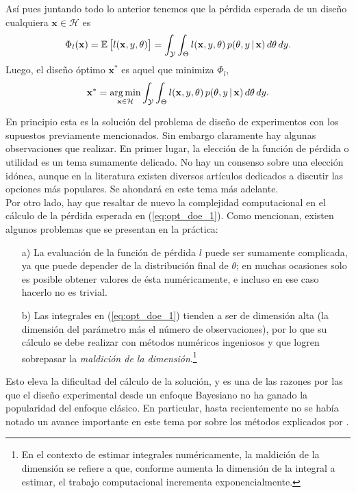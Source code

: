 Así pues juntando todo lo anterior tenemos que la pérdida esperada de un diseño cualquiera $\mathbf{x} \in \mathcal{H}$ es
\begin{equation*}
	\Phi_l(\mathbf{x}) = \mathbb{E} \left[ l(\mathbf{x}, y, \theta) \right] = \int_{\mathcal{Y}} \int_{\Theta} l(\mathbf{x}, y, \theta) \, p(\theta, y \, | \, \mathbf{x}) \,d \theta \,d y.
\end{equation*}
Luego, el diseño óptimo $\mathbf{x}^*$ es aquel que minimiza $\Phi_l$,
\begin{equation} \label{eq:opt_doe_1}
	\mathbf{x}^* = \operatorname*{arg\,min}_{ \mathbf{x} \in \mathcal{H} } \int_{\mathcal{Y}} \int_{\Theta} l(\mathbf{x}, y, \theta) \, p( \theta, y \, | \, \mathbf{x} ) \,d \theta \,d y. 
\end{equation}

En principio esta es la solución del problema de diseño de experimentos con los supuestos previamente mencionados. Sin embargo claramente hay algunas observaciones que realizar. En primer lugar, la elección de la función de pérdida o utilidad es un tema sumamente delicado. No hay un consenso sobre una elección idónea, aunque en la literatura existen diversos artículos dedicados a discutir las opciones más populares. Se ahondará en este tema más adelante. \\

Por otro lado, hay que resaltar de nuevo la complejidad computacional en el cálculo de la pérdida esperada en (\ref{eq:opt_doe_1}). Como \cite{Woods_etal} mencionan, existen algunos problemas que se presentan en la práctica:
\begin{itemize}
\item[a)] La evaluación de la función de pérdida $l$ puede ser sumamente complicada, ya que puede depender de la distribución final de $\theta$; en muchas ocasiones solo es posible obtener valores de ésta numéricamente, e incluso en ese caso hacerlo no es trivial.
\item[b)] Las integrales en (\ref{eq:opt_doe_1}) tienden a ser de dimensión alta (la dimensión del parámetro más el número de observaciones), por lo que su cálculo se debe realizar con métodos numéricos ingeniosos y que logren sobrepasar la \textit{maldición de la dimensión}.\footnote{En el contexto de estimar integrales numéricamente, la maldición de la dimensión se refiere a que, conforme aumenta la dimensión de la integral a estimar, el trabajo computacional incrementa exponencialmente.}
\end{itemize}


Esto eleva la dificultad del cálculo de la solución, y es una de las razones por las que el diseño experimental desde un enfoque Bayesiano no ha ganado la popularidad del enfoque clásico. En particular, hasta recientemente no se había notado un avance importante en este tema por sobre los métodos explicados por \cite{chaloner_verdinelli_doe}.





